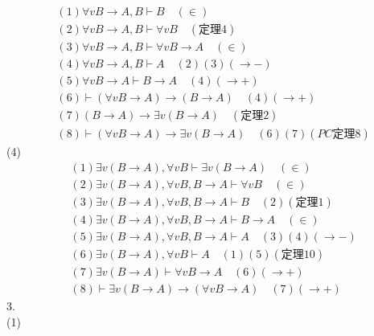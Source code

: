 \documentclass{article}
\begin{document}
\[
\begin{aligned}
&(1)\forall v B \to A, B \vdash B \quad (\in) \\
&(2)\forall v B \to A, B \vdash \forall v B \quad (\mbox{定理}4) \\
&(3)\forall v B \to A, B \vdash \forall v B \to A \quad (\in) \\
&(4)\forall v B \to A, B \vdash A \quad (2)(3)(\to -) \\
&(5)\forall v B \to A \vdash B \to A  \quad (4)(\to +) \\
&(6)\vdash (\forall v B \to A) \to (B \to A) \quad (4)(\to +) \\
&(7)(B \to A) \to \exists v (B \to A) \quad (\mbox{定理}2) \\
&(8)\vdash (\forall v B \to A) \to \exists v (B \to A) \quad (6)(7)(PC\mbox{定理}8)
\end{aligned}    
\]
(4)
\[
\begin{aligned}
&(1)\exists v (B \to A), \forall v B \vdash \exists v (B \to A) \quad (\in) \\
&(2)\exists v (B \to A), \forall v B, B \to A \vdash \forall v B \quad (\in) \\
&(3)\exists v (B \to A), \forall v B, B \to A \vdash B \quad (2)(\mbox{定理}1) \\
&(4)\exists v (B \to A), \forall v B, B \to A \vdash B \to A \quad (\in) \\
&(5)\exists v (B \to A), \forall v B, B \to A \vdash A  \quad (3)(4)(\to -) \\
&(6)\exists v (B \to A), \forall v B \vdash A \quad (1)(5)(\mbox{定理}10) \\
&(7)\exists v (B \to A) \vdash \forall v B \to A \quad (6)(\to +) \\
&(8)\vdash \exists v (B \to A) \to (\forall v B \to A) \quad (7)(\to +)
\end{aligned}    
\]
3.\\
(1)
\end{document}
